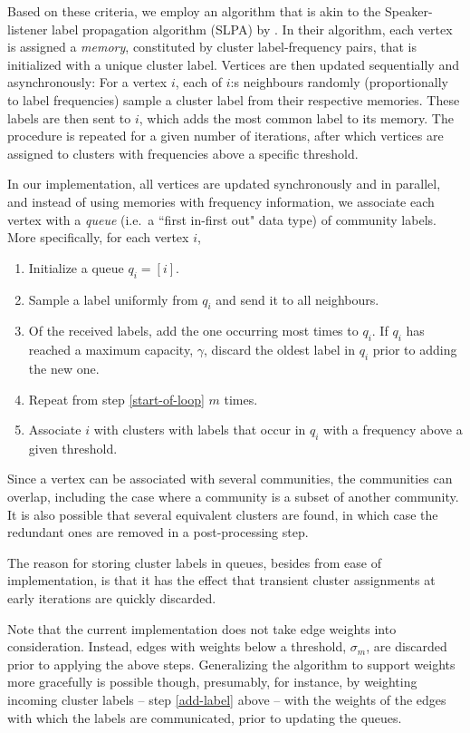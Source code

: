 \documentclass{kais}
\begin{document}
Based on these criteria, we employ an algorithm that is akin to the Speaker-listener
label propagation algorithm (SLPA) by . In their algorithm, each vertex is assigned
a \emph{memory}, constituted by cluster label-frequency pairs, that is initialized with a unique cluster label. Vertices
are then updated sequentially and asynchronously: For a vertex $i$, each of $i$:s neighbours randomly 
(proportionally to label frequencies) sample a cluster label from their respective memories. These labels are then
sent to $i$, which adds the most common label to its memory. The procedure is repeated for a given number of 
iterations, after which vertices are assigned to clusters with frequencies above a specific threshold. 

In our implementation, all vertices are updated synchronously and in parallel, and instead of using
memories with frequency information, we associate each vertex with a \emph{queue} (i.e.\ a ``first in-first out" data type)
of community labels. More specifically, for each vertex $i$,
\begin{enumerate}
\item Initialize a queue $q_i = [i]$.
\item \label{start-of-loop} Sample a label uniformly from $q_i$ and send it to all neighbours.
\item \label{add-label} Of the received labels, add the one occurring most times to $q_i$. If $q_i$ has reached a maximum 
capacity, $\gamma$, discard the oldest label in $q_i$ prior to adding the new one. 
\item Repeat from step \ref{start-of-loop} $m$ times.
\item Associate $i$ with clusters with labels that occur in $q_i$ with a frequency above a given threshold.
\end{enumerate}
Since a vertex can be associated with several communities, the communities can overlap, including
the case where a community is a subset of another community. It is also possible that several equivalent clusters
are found, in which case the redundant ones are removed in a post-processing step.

The reason for storing cluster labels in queues, besides from ease of implementation, is that it has the effect 
that transient cluster assignments at early iterations are quickly discarded. 

Note that the current implementation does not take edge weights into consideration. Instead, edges with
weights below a threshold, $\sigma_m$, are discarded prior to applying the above steps. Generalizing the algorithm 
to support weights more gracefully is possible though, presumably, for instance, by weighting incoming cluster 
labels -- step \ref{add-label}  above -- with the weights of the edges with which the labels are communicated, prior to updating the queues.
\end{document}
